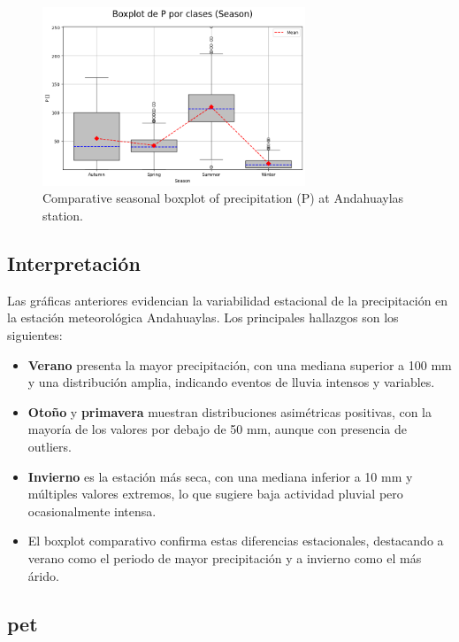 \vspace{0.2cm}

\begin{figure}[htbp]
\centering
\includegraphics[width=0.7\textwidth]{resultados/por_estacion_del_anio/boxplot_clases_por_estacion/Andahuaylas/P_ClassBoxplot_Season.png}
\caption{Comparative seasonal boxplot of precipitation (P) at Andahuaylas station.}
\label{fig:andahuaylas_p_box}
\end{figure}

\subsection*{Interpretación}

Las gráficas anteriores evidencian la variabilidad estacional de la precipitación en la estación meteorológica Andahuaylas. Los principales hallazgos son los siguientes:

\begin{itemize}
    \item \textbf{Verano} presenta la mayor precipitación, con una mediana superior a 100 mm y una distribución amplia, indicando eventos de lluvia intensos y variables.
    \item \textbf{Otoño} y \textbf{primavera} muestran distribuciones asimétricas positivas, con la mayoría de los valores por debajo de 50 mm, aunque con presencia de outliers.
    \item \textbf{Invierno} es la estación más seca, con una mediana inferior a 10 mm y múltiples valores extremos, lo que sugiere baja actividad pluvial pero ocasionalmente intensa.
    \item El boxplot comparativo confirma estas diferencias estacionales, destacando a verano como el periodo de mayor precipitación y a invierno como el más árido.
\end{itemize}


\subsection{\gls{pet} }

